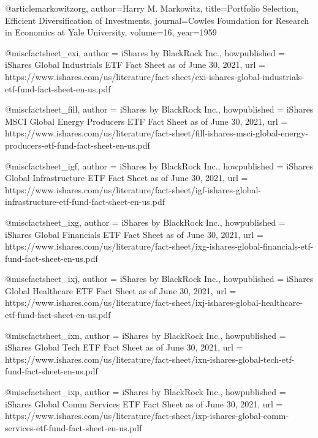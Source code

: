 @article{markowitzorg,
        author={Harry M. Markowitz},
        title={Portfolio Selection, Efficient Diversification of Investments},
        journal={Cowles Foundation for Research in Economics at Yale University},
        volume={16},
        year={1959}
}


@misc{factsheet_exi,
  author        = {iShares by BlackRock Inc.},
  howpublished  = {iShares Global Industrials ETF Fact Sheet as of June 30, 2021},
  url           = {https://www.ishares.com/us/literature/fact-sheet/exi-ishares-global-industrials-etf-fund-fact-sheet-en-us.pdf}
}

@misc{factsheet_fill,
  author        = {iShares by BlackRock Inc.},
  howpublished  = {iShares MSCI Global Energy Producers ETF Fact Sheet as of June 30, 2021},
  url           = {https://www.ishares.com/us/literature/fact-sheet/fill-ishares-msci-global-energy-producers-etf-fund-fact-sheet-en-us.pdf}
}

@misc{factsheet_igf,
  author        = {iShares by BlackRock Inc.},
  howpublished  = {iShares Global Infrastructure ETF Fact Sheet as of June 30, 2021},
  url           = {https://www.ishares.com/us/literature/fact-sheet/igf-ishares-global-infrastructure-etf-fund-fact-sheet-en-us.pdf}
}

@misc{factsheet_ixg,
  author        = {iShares by BlackRock Inc.},
  howpublished  = {iShares Global Financials ETF Fact Sheet as of June 30, 2021},
  url           = {https://www.ishares.com/us/literature/fact-sheet/ixg-ishares-global-financials-etf-fund-fact-sheet-en-us.pdf}
}

@misc{factsheet_ixj,
  author        = {iShares by BlackRock Inc.},
  howpublished  = {iShares Global Healthcare ETF Fact Sheet as of June 30, 2021},
  url           = {https://www.ishares.com/us/literature/fact-sheet/ixj-ishares-global-healthcare-etf-fund-fact-sheet-en-us.pdf}
}

@misc{factsheet_ixn,
  author        = {iShares by BlackRock Inc.},
  howpublished  = {iShares Global Tech ETF Fact Sheet as of June 30, 2021},
  url           = {https://www.ishares.com/us/literature/fact-sheet/ixn-ishares-global-tech-etf-fund-fact-sheet-en-us.pdf}
}

@misc{factsheet_ixp,
  author        = {iShares by BlackRock Inc.},
  howpublished  = {iShares Global Comm Services ETF Fact Sheet as of June 30, 2021},
  url           = {https://www.ishares.com/us/literature/fact-sheet/ixp-ishares-global-comm-services-etf-fund-fact-sheet-en-us.pdf}
}

